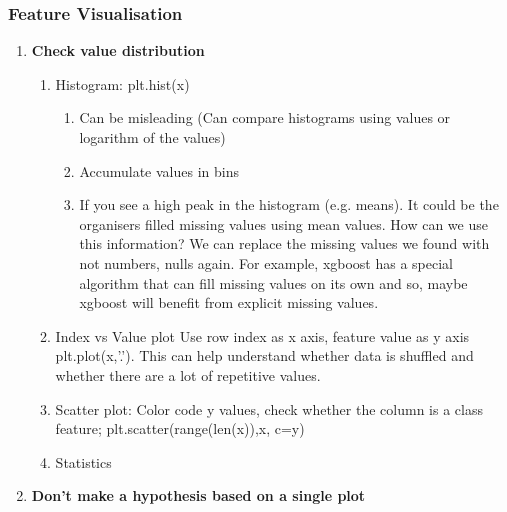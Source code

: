 \documentclass[11pt, twoside]{article}   	%
\begin{document}
    


%
\subsubsection{Feature Visualisation} 

\renewcommand{\labelenumii}{\alph{enumii}}
\begin{enumerate}
  \item \textbf{Check value distribution}
    \begin{enumerate}
      \item Histogram: plt.hist(x)
       \begin{enumerate}
        \item  Can be misleading (Can compare histograms using values or logarithm of the values)
         \item  Accumulate values in bins 
         \item If you see a high peak in the histogram (e.g. means). It could be the organisers filled missing values using mean values. How can we use this information? We can replace the missing values we found with not numbers, nulls again. For example, xgboost has a special algorithm that can fill missing values on its own and so, maybe xgboost will benefit from explicit missing values. 
      \end{enumerate}
      \item  Index vs Value plot
      Use row index as x axis, feature value as y axis plt.plot(x,'.'). This can help understand whether data is shuffled and whether there are a lot of repetitive values. 

      \item Scatter plot: Color code y values, check whether the column is a class feature; plt.scatter(range(len(x)),x, c=y) 
       \item  Statistics
      
           
    \end{enumerate}
  \item \textbf{Don't make a hypothesis based on a single plot}
  \end{enumerate}

\end{document}
